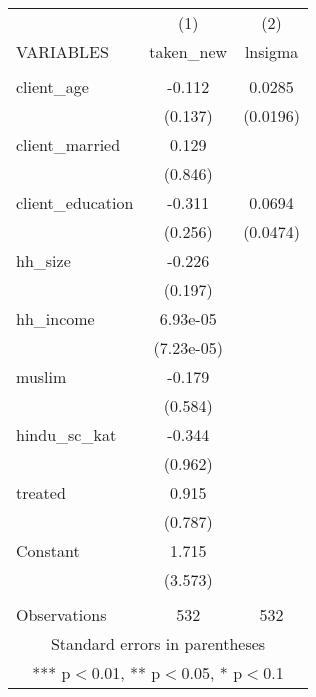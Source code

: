 \begin{tabular}{lcc} \hline
 & (1) & (2) \\
VARIABLES & taken\_new & lnsigma \\ \hline
 &  &  \\
client\_age & -0.112 & 0.0285 \\
 & (0.137) & (0.0196) \\
client\_married & 0.129 &  \\
 & (0.846) &  \\
client\_education & -0.311 & 0.0694 \\
 & (0.256) & (0.0474) \\
hh\_size & -0.226 &  \\
 & (0.197) &  \\
hh\_income & 6.93e-05 &  \\
 & (7.23e-05) &  \\
muslim & -0.179 &  \\
 & (0.584) &  \\
hindu\_sc\_kat & -0.344 &  \\
 & (0.962) &  \\
treated & 0.915 &  \\
 & (0.787) &  \\
Constant & 1.715 &  \\
 & (3.573) &  \\
 &  &  \\
 Observations & 532 & 532 \\ \hline
\multicolumn{3}{c}{ Standard errors in parentheses} \\
\multicolumn{3}{c}{ *** p$<$0.01, ** p$<$0.05, * p$<$0.1} \\
\end{tabular}
